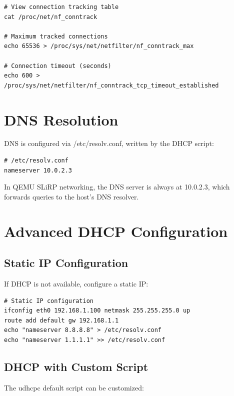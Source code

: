 \begin{lstlisting}
# View connection tracking table
cat /proc/net/nf_conntrack

# Maximum tracked connections
echo 65536 > /proc/sys/net/netfilter/nf_conntrack_max

# Connection timeout (seconds)
echo 600 > /proc/sys/net/netfilter/nf_conntrack_tcp_timeout_established
\end{lstlisting}

\section{DNS Resolution}

DNS is configured via /etc/resolv.conf, written by the DHCP script:

\begin{lstlisting}
# /etc/resolv.conf
nameserver 10.0.2.3
\end{lstlisting}

In QEMU SLiRP networking, the DNS server is always at 10.0.2.3, which
forwards queries to the host's DNS resolver.

\section{Advanced DHCP Configuration}

\subsection{Static IP Configuration}

If DHCP is not available, configure a static IP:

\begin{lstlisting}
# Static IP configuration
ifconfig eth0 192.168.1.100 netmask 255.255.255.0 up
route add default gw 192.168.1.1
echo "nameserver 8.8.8.8" > /etc/resolv.conf
echo "nameserver 1.1.1.1" >> /etc/resolv.conf
\end{lstlisting}

\subsection{DHCP with Custom Script}

The udhcpc default script can be customized:

